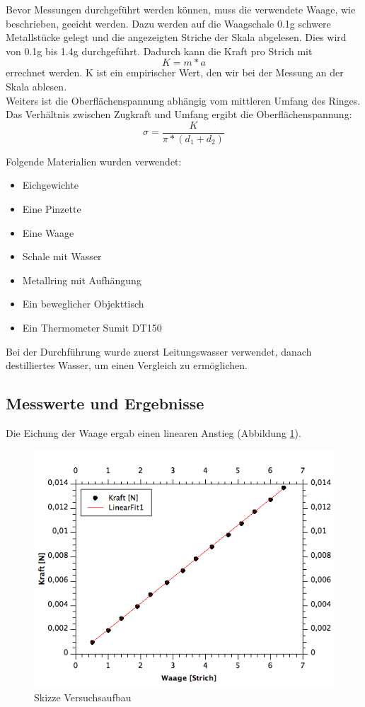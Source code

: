 \documentclass[12pt,a4paper]{article}
\begin{document}
\begin{multicols}{2}
\noindent
Bevor Messungen durchgeführt werden können, muss die verwendete Waage, wie beschrieben, geeicht werden. Dazu werden auf die Waagschale 0.1g schwere Metallstücke gelegt und die angezeigten Striche der Skala abgelesen. Dies wird von 0.1g bis 1.4g durchgeführt. Dadurch kann die Kraft pro Strich mit
$$K = m * a$$
errechnet werden. K ist ein empirischer Wert, den wir bei der Messung an der Skala ablesen.\\
Weiters ist die Oberflächenspannung abhängig vom mittleren Umfang des Ringes. Das Verhältnis zwischen Zugkraft und Umfang ergibt die Oberflächenspannung:
$$\sigma = \frac{K}{\pi * (d_1 + d_2)}$$

\noindent
Folgende Materialien wurden verwendet:
\begin{itemize}
	\item Eichgewichte
	\item Eine Pinzette
	\item Eine Waage
	\item Schale mit Wasser
	\item Metallring mit Aufhängung
	\item Ein beweglicher Objekttisch
	\item Ein Thermometer Sumit DT150
\end{itemize}

\noindent Bei der Durchführung wurde zuerst Leitungswasser verwendet, danach destilliertes Wasser, um einen Vergleich zu ermöglichen.

\subsection{Messwerte und Ergebnisse}
Die Eichung der Waage ergab einen linearen Anstieg (Abbildung \ref{fig:oberflaeche_eichung_fit}). 

\begin{figure}[H]
	\centering
	\includegraphics[scale=0.45]{./figure/Waageneichung-Fit_02.png}
	\caption{Skizze Versuchsaufbau}
	\label{fig:oberflaeche_eichung_fit}
\end{figure}


\end{multicols}
\end{document}
